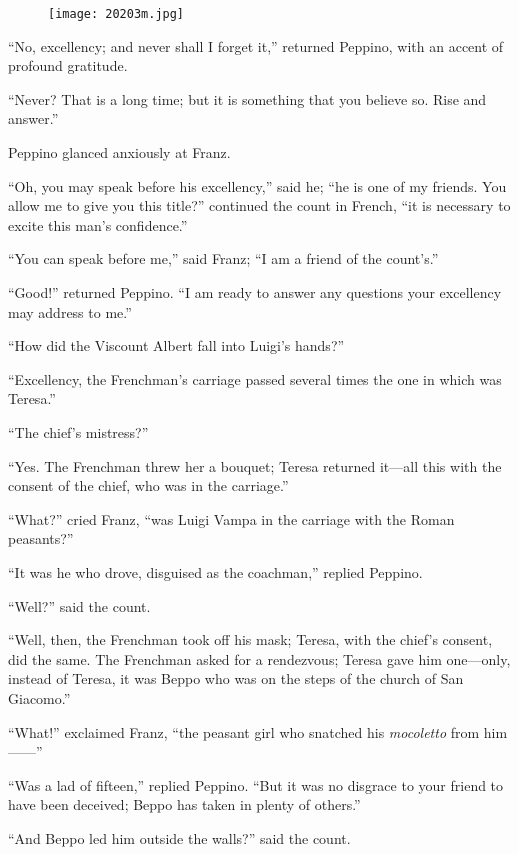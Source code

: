 \begin{figure}[ht]
\texttt{[image: 20203m.jpg]}
\end{figure}

“No, excellency; and never shall I forget it,” returned Peppino, with
an accent of profound gratitude.

“Never? That is a long time; but it is something that you believe so.
Rise and answer.”

Peppino glanced anxiously at Franz.

“Oh, you may speak before his excellency,” said he; “he is one of my
friends. You allow me to give you this title?” continued the count in
French, “it is necessary to excite this man’s confidence.”

“You can speak before me,” said Franz; “I am a friend of the count’s.”

“Good!” returned Peppino. “I am ready to answer any questions your
excellency may address to me.”

“How did the Viscount Albert fall into Luigi’s hands?”

“Excellency, the Frenchman’s carriage passed several times the one in
which was Teresa.”

“The chief’s mistress?”

“Yes. The Frenchman threw her a bouquet; Teresa returned it—all this
with the consent of the chief, who was in the carriage.”

“What?” cried Franz, “was Luigi Vampa in the carriage with the Roman
peasants?”

“It was he who drove, disguised as the coachman,” replied Peppino.

“Well?” said the count.

“Well, then, the Frenchman took off his mask; Teresa, with the chief’s
consent, did the same. The Frenchman asked for a rendezvous; Teresa
gave him one—only, instead of Teresa, it was Beppo who was on the steps
of the church of San Giacomo.”

“What!” exclaimed Franz, “the peasant girl who snatched his \textit{mocoletto}
from him——”

“Was a lad of fifteen,” replied Peppino. “But it was no disgrace to
your friend to have been deceived; Beppo has taken in plenty of
others.”

“And Beppo led him outside the walls?” said the count.

